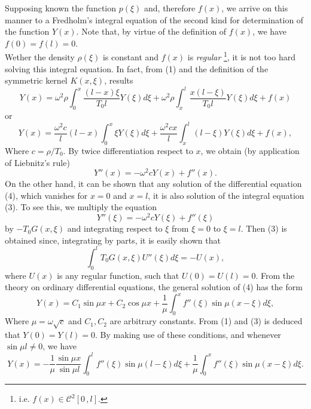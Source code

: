 \documentclass[12pt]{article}
\begin{document}
Supposing known  the function $p(\xi)$ and, therefore $f(x)$, we arrive on this manner to a Fredholm's integral equation of the second kind for determination of the function $Y(x)$. Note that, by virtue of the definition of $f(x)$, we have $f(0)=f(l)=0$. \\
Wether the density $\rho(\xi)$ is constant and $f(x)$ is \emph{regular} {\footnote{i.e. $f(x)\in \mathcal{C}^2[0\,,l] $.}}, it is not too hard solving this integral equation. In fact, from (1) and the definition of the symmetric kernel $K(x,\xi)$, results
\begin{equation*}
Y(x)=\omega^2\rho\int_0^x \frac{(l-x)\xi}{T_0l}Y(\xi)d\xi+
\omega^2\rho\int_x^l \frac{x(l-\xi)}{T_0l}Y(\xi)d\xi+f(x)
\end{equation*}
or
\begin{equation*}
Y(x)=\frac{\omega^2c}{l}(l-x)\int_0^x \xi Y(\xi)d\xi+
\frac{\omega^2cx}{l}\int_x^l (l-\xi)Y(\xi)d\xi+f(x),
\end{equation*}
Where $c=\rho/T_0$. By twice differentiation respect to $x$, we obtain (by application of Liebnitz's rule)
\begin{equation}
Y''(x)=-\omega^2cY(x)+f''(x).
\end{equation}
On the other hand, it can be shown that any solution of the differential equation (4), which vanishes for $x=0$ and $x=l$, it is also solution of the integral equation (3). To see this, we multiply the equation
\begin{equation*}
Y''(\xi)=-\omega^2cY(\xi)+f''(\xi)
\end{equation*}
by $-T_0G(x,\xi)$ and integrating respect to $\xi$ from $\xi=0$ to $\xi=l$. Then (3) is obtained since, integrating by parts, it is easily shown that
\begin{equation*}
\int_0^l T_0G(x,\xi)U''(\xi)d\xi=-U(x),
\end{equation*}
where $U(x)$ is any regular function, such that $U(0)=U(l)=0$. 
From the theory on ordinary differential equations, the general solution of (4) has the form
\begin{equation*}
Y(x)=C_1\sin\mu x+C_2\cos\mu x+\frac{1}{\mu}\int_0^x f''(\xi)\sin\mu(x-\xi)d\xi,
\end{equation*}
Where $\mu=\omega\sqrt{c}$ and $C_1,C_2$ are arbitrary constants. From (1) and (3) is deduced that $Y(0)=Y(l)=0$. By making use of these conditions, and whenever $\sin\mu l\neq 0$, we have
\begin{equation}
Y(x)=-\frac{1}{\mu}\frac{\sin\mu x}{\sin\mu l}\int_0^l f''(\xi)\sin\mu(l-\xi)d\xi+
\frac{1}{\mu}\int_0^x f''(\xi)\sin\mu(x-\xi)d\xi.
\end{equation}
\end{document}
